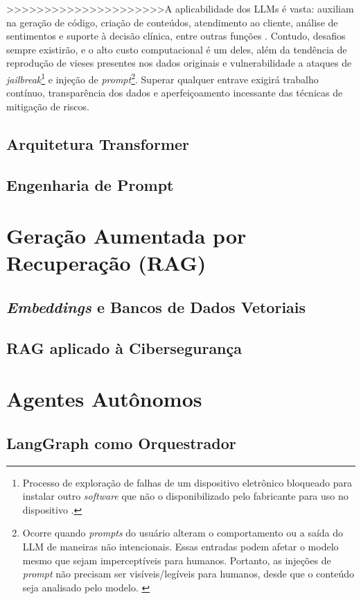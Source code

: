 >>>>>>>>>>>>>>>>>>>>>A aplicabilidade dos LLMs é vasta: auxiliam na geração de código, criação de conteúdos, atendimento ao cliente, análise de sentimentos e suporte à decisão clínica, entre outras funções \cite{motlagh2024llmcyber}. 
Contudo, desafios sempre existirão, e o alto custo computacional é um deles, além da tendência de reprodução de vieses presentes nos dados originais e vulnerabilidade a ataques de \textit{jailbreak}\footnote{Processo de exploração de falhas de um dispositivo eletrônico bloqueado para instalar outro \textit{software} que não o disponibilizado pelo fabricante para uso no dispositivo \cite{kaspersky2024jailbreaking}.}
e injeção de \textit{prompt}\footnote{Ocorre quando \textit{prompts} do usuário alteram o comportamento ou a saída do LLM de maneiras não intencionais. 
Essas entradas podem afetar o modelo mesmo que sejam imperceptíveis para humanos. Portanto, as injeções de \textit{prompt} não precisam ser visíveis/legíveis para humanos, desde que o conteúdo seja analisado pelo modelo. \cite{owasp2024promptinjection}}.
Superar qualquer entrave exigirá trabalho contínuo, transparência dos dados e aperfeiçoamento incessante das técnicas de mitigação de riscos. 


\subsection{Arquitetura Transformer}



\subsection{Engenharia de Prompt}



\section{Geração Aumentada por Recuperação (RAG)}



\subsection{\textit{Embeddings} e Bancos de Dados Vetoriais}



\subsection{RAG aplicado à Cibersegurança}



\section{Agentes Autônomos}






\subsection{LangGraph como Orquestrador}